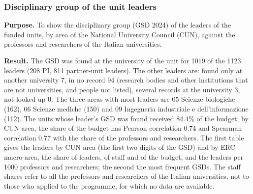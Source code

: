 \documentclass[11pt,a4paper]{article}
\begin{document}
\subsubsection{Disciplinary group of the unit leaders}
\textbf{Purpose.} To show the disciplinary group (GSD 2024) of the leaders of the funded units, by area of the National University Council (CUN), against the professors and researchers of the Italian universities.

\textbf{Result.} The GSD was found at the university of the unit for 1019 of the 1123 leaders (208 PI, 811 partner-unit leaders). The other leaders are: found only at another university 7, in no record 94 (research bodies and other institutions that are not universities, and people not listed), several records at the university 3, not looked up 0. The three areas with most leaders are 05 Scienze biologiche (162), 06 Scienze mediche (150) and 09 Ingegneria industriale e dell'informazione (112). The units whose leader's GSD was found received 84.4\% of the budget; by CUN area, the share of the budget has Pearson correlation 0.74 and Spearman correlation 0.77 with the share of the professors and researchers. The first table gives the leaders by CUN area (the first two digits of the GSD) and by ERC macro-area, the share of leaders, of staff and of the budget, and the leaders per 1000 professors and researchers; the second the most frequent GSDs. The staff shares refer to all the professors and researchers of the Italian universities, not to those who applied to the programme, for which no data are available.
\end{document}
